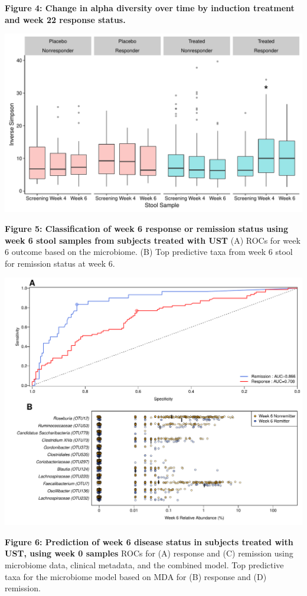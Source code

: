 \documentclass[11pt,]{article}
\begin{document}
\newpage

\textbf{Figure 4: Change in alpha diversity over time by induction
treatment and week 22 response status.}

\includegraphics{figures/Figure4_wk046.adivXvisitXindtrtXrelRSPwk22.pdf}

\newpage

\textbf{Figure 5: Classification of week 6 response or remission status
using week 6 stool samples from subjects treated with UST} (A) ROCs for
week 6 outcome based on the microbiome. (B) Top predictive taxa from
week 6 stool for remission status at week 6.

\includegraphics{figures/Figure5_wk6Xwk6.pdf}

\newpage

\textbf{Figure 6: Prediction of week 6 disease status in subjects
treated with UST, using week 0 samples} ROCs for (A) response and (C)
remission using microbiome data, clinical metadata, and the combined
model. Top predictive taxa for the microbiome model based on MDA for (B)
response and (D) remission.
\end{document}
